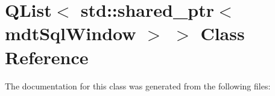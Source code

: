 \hypertarget{class_q_list_3_01std_1_1shared__ptr_3_01mdt_sql_window_01_4_01_4}{\section{Q\-List$<$ std\-:\-:shared\-\_\-ptr$<$ mdt\-Sql\-Window $>$ $>$ Class Reference}
\label{class_q_list_3_01std_1_1shared__ptr_3_01mdt_sql_window_01_4_01_4}
}


The documentation for this class was generated from the following files\-: